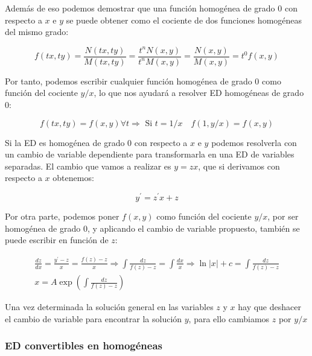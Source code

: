 \documentclass[a4paper,12pt,titlepage]{article}
\begin{document}
Además de eso podemos demostrar que una función homogénea de grado 0 con respecto a $x$ e $y$ se puede obtener como el cociente de dos funciones homogéneas del mismo grado:

\begin{equation*}
    f(tx,ty) = \frac{N(tx,ty)}{M(tx,ty)} = \frac{t^nN(x,y)}{t^nM(x,y)} = \frac{N(x,y)}{M(x,y)} = t^0 f(x,y)
\end{equation*}

Por tanto, podemos escribir cualquier función homogénea de grado 0 como función del cociente $y/x$, lo que nos ayudará a resolver ED homogéneas de grado 0:

\begin{equation*}
    f(tx,ty) = f(x,y) \forall t \Rightarrow \text{ Si } t=1/x \quad f(1,y/x) = f(x,y)
\end{equation*}

\par Si la ED es homogénea de grado 0 con respecto a $x$ e $y$ podemos resolverla con un cambio de variable dependiente para transformarla en una ED de variables separadas. El cambio que vamos a realizar es $y=zx$, que si derivamos con respecto a $x$ obtenemos:

\begin{equation*}
    y^{\prime} = z^{\prime}x+z
\end{equation*}

Por otra parte, podemos poner $f(x,y)$ como función del cociente $y/x$, por ser homogénea de grado 0, y aplicando el cambio de variable propuesto, también se puede escribir en función de $z$:

\begin{equation*}
    \begin{gathered}
    \frac{dz}{dx} = \frac{y^\prime - z}{x} = \frac{f(z)-z}{x} \Rightarrow \int \frac{dz}{f(z)-z} = \int \frac{dx}{x} \Rightarrow \ln |x| + c = \int \frac{dz}{f(z)-z} \\
    x = A \exp \left (\int \frac{dz}{f(z)-z}\right )
    \end{gathered}
\end{equation*}

Una vez determinada la solución general en las variables $z$ y $x$ hay que deshacer el cambio de variable para encontrar la solución $y$, para ello cambiamos $z$ por $y/x$

\subsubsection{ED convertibles en homogéneas}
\end{document}
